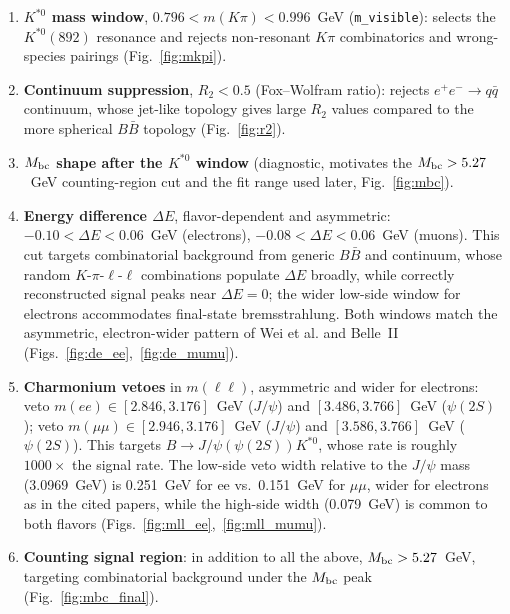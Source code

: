 \documentclass[11pt]{article}
\begin{document}
\begin{enumerate}
\item \textbf{$K^{*0}$ mass window}, $0.796<m(K\pi)<0.996$~GeV
(\texttt{m\_visible}): selects the $K^{*0}(892)$ resonance and rejects
non-resonant $K\pi$ combinatorics and wrong-species pairings (Fig.~\ref{fig:mkpi}).

\item \textbf{Continuum suppression}, $R_2<0.5$ (Fox--Wolfram ratio):
rejects $e^+e^-\to q\bar q$ continuum, whose jet-like topology gives
large $R_2$ values compared to the more spherical $B\bar B$ topology
(Fig.~\ref{fig:r2}).

\item \textbf{$M_{\rm bc}$ shape after the $K^{*0}$ window} (diagnostic,
motivates the $M_{\rm bc}>5.27$~GeV counting-region cut and the fit
range used later, Fig.~\ref{fig:mbc}).

\item \textbf{Energy difference $\Delta E$}, flavor-dependent and
asymmetric: $-0.10<\Delta E<0.06$~GeV (electrons), $-0.08<\Delta
E<0.06$~GeV (muons). This cut targets combinatorial background from
generic $B\bar B$ and continuum, whose random $K$-$\pi$-$\ell$-$\ell$
combinations populate $\Delta E$ broadly, while correctly reconstructed
signal peaks near $\Delta E=0$; the wider low-side window for
electrons accommodates final-state bremsstrahlung. Both windows match
the asymmetric, electron-wider pattern of Wei et al. and Belle~II
(Figs.~\ref{fig:de_ee},~\ref{fig:de_mumu}).

\item \textbf{Charmonium vetoes} in $m(\ell\ell)$, asymmetric and wider
for electrons: veto $m(ee)\in[2.846,3.176]$~GeV ($J/\psi$) and
$[3.486,3.766]$~GeV ($\psi(2S)$); veto $m(\mu\mu)\in[2.946,3.176]$~GeV
($J/\psi$) and $[3.586,3.766]$~GeV ($\psi(2S)$). This targets
$B\to J/\psi(\psi(2S))K^{*0}$, whose rate is roughly $1000\times$ the
signal rate. The low-side veto width relative to the $J/\psi$ mass
(3.0969~GeV) is 0.251~GeV for ee vs.\ 0.151~GeV for $\mu\mu$, wider for
electrons as in the cited papers, while the high-side width (0.079~GeV)
is common to both flavors (Figs.~\ref{fig:mll_ee},~\ref{fig:mll_mumu}).

\item \textbf{Counting signal region}: in addition to all the above,
$M_{\rm bc}>5.27$~GeV, targeting combinatorial background under the
$M_{\rm bc}$ peak (Fig.~\ref{fig:mbc_final}).
\end{enumerate}
\end{document}
